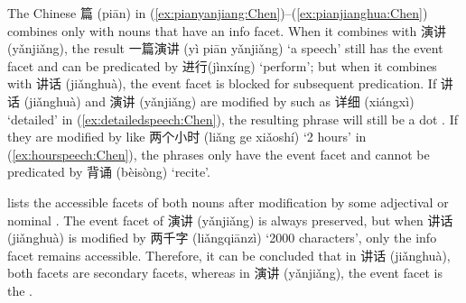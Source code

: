 \documentclass[output=paper,colorlinks,citecolor=brown,chinesefont]{langscibook}
\begin{document}

The Chinese  {\cn 篇} (pi\={a}n) in (\ref{ex:pianyanjiang:Chen})--(\ref{ex:pianjianghua:Chen}) combines only with nouns that have an info facet. %
 When it combines with {\cn 演讲} (y\v{a}nji\v{a}ng), the result %
  {\cn 一篇演讲} (y\`{i} pi\={a}n y\v{a}nji\v{a}ng) `a speech' still has the event facet and can be predicated by {\cn 进行}(j\`{i}nx\'{i}ng) `perform'; but when it combines with {\cn 讲话} (ji\v{a}nghu\`{a}), the event facet is blocked for subsequent predication. %
If {\cn 讲话} (ji\v{a}nghu\`{a}) and {\cn 演讲} (y\v{a}nji\v{a}ng) are modified by   such as {\cn 详细} (xi\'{a}ngx\`{i}) `detailed' in (\ref{ex:detailedspeech:Chen}), the resulting phrase will still be a dot . If they are modified by   like {\cn 两个小时} (li\v{a}ng ge xi\v{a}osh\'{i}) `2 hours' in (\ref{ex:hourspeech:Chen}), the phrases only have the event facet and cannot be predicated by {\cn 背诵} (b\`{e}is\`{o}ng) `recite'.

 lists the accessible facets of both nouns after modification by some adjectival or nominal . The event facet of {\cn 演讲} (y\v{a}nji\v{a}ng) is always preserved, but when {\cn 讲话} (ji\v{a}nghu\`{a}) is modified by {\cn 两千字} (li\v{a}ngqi\={a}nz\`{i}) `2000 characters', only the info facet remains accessible. %
 Therefore, it can be concluded that in {\cn 讲话} (ji\v{a}nghu\`{a}), both facets are secondary facets, whereas in {\cn 演讲} (y\v{a}nji\v{a}ng), the event facet is the .
\end{document}
